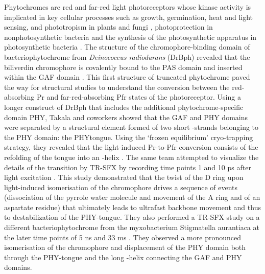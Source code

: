 Phytochromes are red and far-red light photoreceptors whose kinase activity is implicated in key cellular processes such as growth, germination, heat and light sensing, and phototropism in plants and fungi \parencite{chengPhytochromeSignalingNetworks2021}, photoprotection in nonphotosynthetic bacteria \parencite{davisBacteriophytochromesPhytochromeLikePhotoreceptors1999} and the synthesis of the photosynthetic apparatus in photosynthetic bacteria \parencite{giraudBacteriophytochromesAnoxygenicPhotosynthetic2008}. The structure of the chromophore-binding domain of bacteriophytochrome from \textit{Deinococcus radiodurans} (DrBph) revealed that the biliverdin chromophore is covalently bound to the PAS domain and inserted within the GAF domain \parencite{wagnerLightsensingKnotRevealed2005}. This first structure of truncated phytochrome paved the way for structural studies to understand the conversion between the red-absorbing Pr and far-red-absorbing Pfr states of the photoreceptor. Using a longer construct of DrBph that includes the additional phytochrome-specific domain PHY, Takala and coworkers showed that the GAF and PHY domains were separated by a structural element formed of two short \textBeta-strands belonging to the PHY domain: the PHYtongue. Using the ‘frozen equilibrium’ cryo-trapping strategy, they revealed that the light-induced Pr-to-Pfr conversion consists of the refolding of the tongue into an \textalpha-helix \parencite{takalaSignalAmplificationTransduction2014}. The same team attempted to visualize the details of the transition by TR-SFX by recording time points 1 and 10 ps after light excitation \parencite{claessonPrimaryStructuralPhotoresponse2020}. This study demonstrated that the twist of the D ring upon light-induced isomerisation of the chromophore drives a sequence of events (dissociation of the pyrrole water molecule and movement of the A ring and of an aspartate residue) that ultimately leads to ultrafast backbone movement and thus to destabilization of the PHY-tongue. They also performed a TR-SFX study on a different bacteriophytochrome from the myxobacterium Stigmatella aurantiaca at the later time points of 5 ns and 33 ms \parencite{carrilloHighresolutionCrystalStructures2021}. They observed a more pronounced isomerisation of the chromophore and displacement of the PHY domain both through the PHY-tongue and the long \textalpha-helix connecting the GAF and PHY domains.

